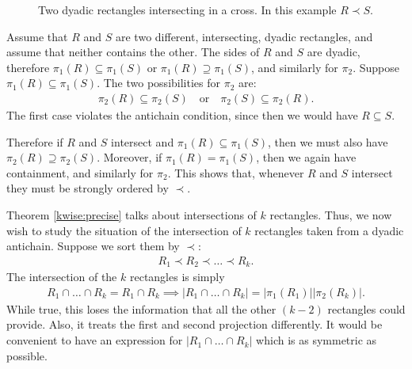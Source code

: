 \documentclass[oneside]{amsart}
\theoremstyle{definition}
\theoremstyle{plain}
\numberwithin{equation}{section}
\numberwithin{theorem}{section}
\begin{document}
\begin{figure}[htpb]
  \centering
  \caption{Two dyadic rectangles intersecting in a cross.
  In this example $R \prec S$.}
  \label{fig:cross}
\end{figure}
Assume that $R$ and $S$ are two different, intersecting, dyadic rectangles,
and assume that neither contains the other.
The sides of $R$ and $S$ are dyadic, therefore $\pi_1(R) \subseteq \pi_1(S)$ or
$\pi_1(R) \supseteq \pi_1(S)$, and similarly for $\pi_2$.
Suppose $\pi_1(R) \subseteq \pi_1(S)$. The two possibilities for $\pi_2$ are:
\begin{align*}
  \pi_2(R) \subseteq \pi_2(S) \quad\text{or}\quad \pi_2(S) \subseteq \pi_2(R).
\end{align*}
The first case violates the antichain condition, since then we would have $R
\subseteq S$.

Therefore if $R$ and $S$ intersect and
$\pi_1(R) \subseteq \pi_1(S)$, then we must also have $\pi_2(R) \supseteq
\pi_2(S)$. Moreover, if $\pi_1(R) = \pi_1(S)$, then we again have containment,
and similarly for $\pi_2$. This shows that, whenever $R$ and $S$ intersect they
must be strongly ordered by $\prec$.

Theorem \ref{kwise:precise} talks about intersections of $k$ rectangles.
Thus, we now wish to study the situation of the intersection of $k$ rectangles
taken from a dyadic antichain. Suppose we sort them by $\prec$:
\begin{align*}
  R_1 \prec R_2 \prec \dots \prec R_k.
\end{align*}
The intersection of the $k$ rectangles is simply
\begin{align*}
  R_1 \cap \dots \cap R_k = R_1 \cap R_k
  \implies |R_1 \cap \dots \cap R_k| = |\pi_1(R_1)||\pi_2(R_k)|.
\end{align*}
While true, this loses the information that all the other $(k-2)$ rectangles
could provide.
Also, it treats the first and second projection differently. It would be
convenient to have an expression for $|R_1 \cap \dots \cap R_k|$ which is as
symmetric as possible.
\end{document}

